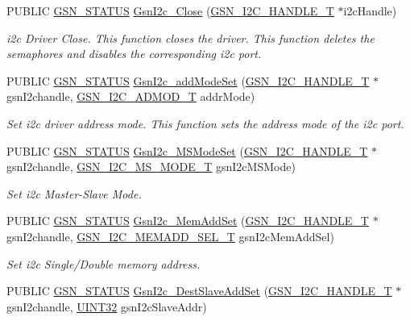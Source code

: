 \begin{DoxyCompactItemize}
PUBLIC \hyperlink{a00660_gada5951904ac6110b1fa95e51a9ddc217}{GSN\_\-STATUS} \hyperlink{a00649_gabe1debde978a1d7934b1acfd178469e0}{GsnI2c\_\-Close} (\hyperlink{a00100}{GSN\_\-I2C\_\-HANDLE\_\-T} $\ast$i2cHandle)
\begin{DoxyCompactList}\small\item\em i2c Driver Close. This function closes the driver. This function deletes the semaphores and disables the corresponding i2c port. \end{DoxyCompactList}\item 
PUBLIC \hyperlink{a00660_gada5951904ac6110b1fa95e51a9ddc217}{GSN\_\-STATUS} \hyperlink{a00649_gaad1c66acad9ae584473a112d4b830c3a}{GsnI2c\_\-addModeSet} (\hyperlink{a00100}{GSN\_\-I2C\_\-HANDLE\_\-T} $\ast$gsnI2chandle, \hyperlink{a00649_gac3021fdaf2e11a7972d53d5292ad5f26}{GSN\_\-I2C\_\-ADMOD\_\-T} addrMode)
\begin{DoxyCompactList}\small\item\em Set i2c driver address mode. This function sets the address mode of the i2c port. \end{DoxyCompactList}\item 
PUBLIC \hyperlink{a00660_gada5951904ac6110b1fa95e51a9ddc217}{GSN\_\-STATUS} \hyperlink{a00649_ga0f151cd2545fe37d9dbeccdb49b321cd}{GsnI2c\_\-MSModeSet} (\hyperlink{a00100}{GSN\_\-I2C\_\-HANDLE\_\-T} $\ast$gsnI2chandle, \hyperlink{a00649_ga72605883ea904f4ee6c310a25142a0ab}{GSN\_\-I2C\_\-MS\_\-MODE\_\-T} gsnI2cMSMode)
\begin{DoxyCompactList}\small\item\em Set i2c Master-\/Slave Mode. \end{DoxyCompactList}\item 
PUBLIC \hyperlink{a00660_gada5951904ac6110b1fa95e51a9ddc217}{GSN\_\-STATUS} \hyperlink{a00649_gabc8cac41e125a051c0bcb393f7833dff}{GsnI2c\_\-MemAddSet} (\hyperlink{a00100}{GSN\_\-I2C\_\-HANDLE\_\-T} $\ast$gsnI2chandle, \hyperlink{a00649_ga3c8e92172b940c58950060ddbccee36d}{GSN\_\-I2C\_\-MEMADD\_\-SEL\_\-T} gsnI2cMemAddSel)
\begin{DoxyCompactList}\small\item\em Set i2c Single/Double memory address. \end{DoxyCompactList}\item 
PUBLIC \hyperlink{a00660_gada5951904ac6110b1fa95e51a9ddc217}{GSN\_\-STATUS} \hyperlink{a00649_ga863505feedae2f7a5958d5f80cbf24cb}{GsnI2c\_\-DestSlaveAddSet} (\hyperlink{a00100}{GSN\_\-I2C\_\-HANDLE\_\-T} $\ast$gsnI2chandle, \hyperlink{a00660_gae1e6edbbc26d6fbc71a90190d0266018}{UINT32} gsnI2cSlaveAddr)

\end{DoxyCompactItemize}
